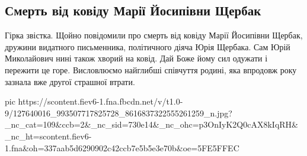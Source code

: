  
 
 
 
 
 
\subsection{Смерть від ковіду Марії Йосипівни Щербак}
\label{sec:26_11_2020.fb.slaboshpyckii_mihajlo.1.kovid_death_scherbak}


Гірка звістка. Щойно повідомили про смерть від ковіду Марії Йосипівни Щербак,
дружини видатного письменника, політичного діяча Юрія Щербака. Сам Юрій
Миколайович нині також хворий на ковід. Дай Боже йому сил одужати і пережити це
горе. Висловлюємо найглибші співчуття родині, яка впродовж року зазнала вже
другої страшної втрати.

\ifcmt
pic https://scontent.fiev6-1.fna.fbcdn.net/v/t1.0-9/127640016_993507717825728_8616837322555261259_n.jpg?_nc_cat=109&ccb=2&_nc_sid=730e14&_nc_ohc=p3OnIyK2Q0cAX8kIqRH&_nc_ht=scontent.fiev6-1.fna&oh=337aab5d6290902c42ccb7e5b5e3e70b&oe=5FE5FFEC
\fi
